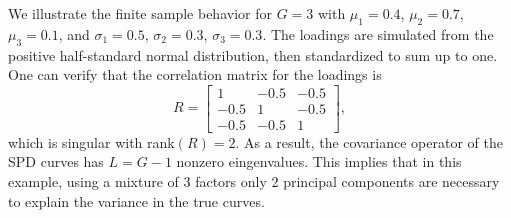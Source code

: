 We illustrate the finite sample behavior for $G=3$ with $\mu_1=0.4 $, $\mu_2=0.7$, $\mu_3=0.1$, and $\sigma_1=0.5$, $\sigma_2=0.3$, $\sigma_3=0.3$. %
The loadings are simulated from the positive half-standard normal distribution, then standardized to sum up to one. One can verify that the correlation matrix for the loadings is 
\[R=\left[ {\begin{array}{ccc}
 1 &-0.5 & -0.5\\ -0.5& 1 &-0.5\\ -0.5 &-0.5& 1    \end{array} } \right],\]
 which is singular with rank$(R)=2$. %
 As a result, the covariance operator of the SPD curves has $L=G-1$ nonzero eingenvalues. This implies that in this example, using a mixture of $3$ factors only $2$ principal components are necessary to explain the variance in the true curves. %
 

